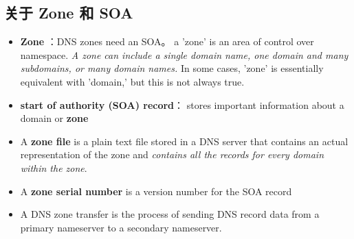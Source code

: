 \subsection{关于 Zone 和 SOA}
\begin{itemize}
\item \textbf{Zone} ：DNS zones need an SOA。 a 'zone' is an area of control over namespace. \textsl{A zone can include a single domain name, one domain and many subdomains, or many domain names.} In some cases, 'zone' is essentially equivalent with 'domain,' but this is not always true.
\item \textbf{start of authority (SOA) record}： stores important information about a domain or \textbf{zone}
\item A \textbf{zone file} is a plain text file stored in a DNS server that contains an actual representation of the zone and \textsl{contains all the records for every domain within the zone}.
\item A \textbf{zone serial number} is a version number for the SOA record
\item A DNS zone transfer is the process of sending DNS record data from a primary nameserver to a secondary nameserver.
\end{itemize}

